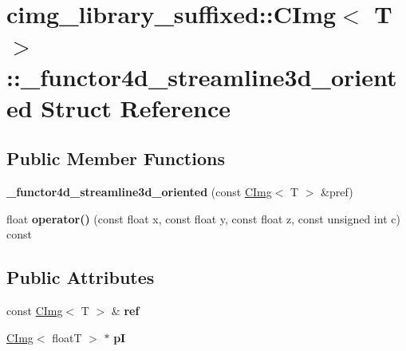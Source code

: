 \hypertarget{structcimg__library__suffixed_1_1CImg_1_1__functor4d__streamline3d__oriented}{}\section{cimg\+\_\+library\+\_\+suffixed\+:\+:C\+Img$<$ T $>$\+:\+:\+\_\+functor4d\+\_\+streamline3d\+\_\+oriented Struct Reference}
\label{structcimg__library__suffixed_1_1CImg_1_1__functor4d__streamline3d__oriented}
\subsection*{Public Member Functions}
\begin{DoxyCompactItemize}
\item 
\mbox{\label{structcimg__library__suffixed_1_1CImg_1_1__functor4d__streamline3d__oriented_a802e4860ae942bde89b9a276aa09d7dc}} 
{\bfseries \+\_\+functor4d\+\_\+streamline3d\+\_\+oriented} (const \hyperlink{structcimg__library__suffixed_1_1CImg}{C\+Img}$<$ T $>$ \&pref)
\item 
\mbox{\label{structcimg__library__suffixed_1_1CImg_1_1__functor4d__streamline3d__oriented_a67b32f469586ab13a6f39fba6910f3d8}} 
float {\bfseries operator()} (const float x, const float y, const float z, const unsigned int c) const
\end{DoxyCompactItemize}
\subsection*{Public Attributes}
\begin{DoxyCompactItemize}
\item 
\mbox{\label{structcimg__library__suffixed_1_1CImg_1_1__functor4d__streamline3d__oriented_a9d776659c2fdbddec7a8e980a37c0605}} 
const \hyperlink{structcimg__library__suffixed_1_1CImg}{C\+Img}$<$ T $>$ \& {\bfseries ref}
\item 
\mbox{\label{structcimg__library__suffixed_1_1CImg_1_1__functor4d__streamline3d__oriented_ab0942d28e7db2c3130a6051abeb2d6f4}} 
\hyperlink{structcimg__library__suffixed_1_1CImg}{C\+Img}$<$ floatT $>$ $\ast$ {\bfseries pI}
\end{DoxyCompactItemize}


